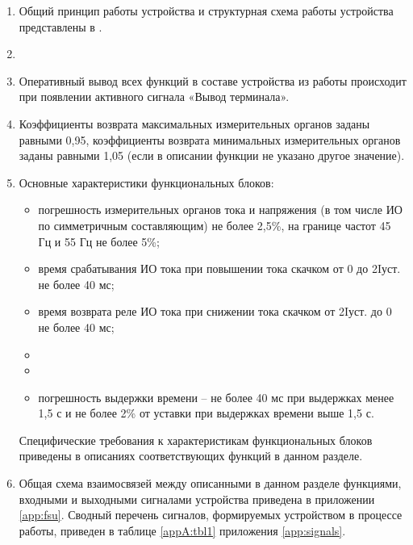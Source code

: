 \begin{enumerate}
\item
Общий принцип работы устройства и структурная схема работы устройства представлены в \ManualUnitGeneral.

\item
{}

\item
Оперативный вывод всех функций в составе устройства из работы происходит при появлении активного сигнала «Вывод терминала».

\item
Коэффициенты возврата максимальных измерительных органов заданы равными 0,95, коэффициенты возврата минимальных измерительных органов заданы равными 1,05 (если в описании функции не указано другое значение).

\item
Основные характеристики функциональных блоков:
\begin{itemize}
    \item погрешность измерительных органов тока и напряжения (в том числе ИО по симметричным составляющим) не более 2,5\%, на границе частот 45 Гц и 55 Гц не более 5\%;
    \item время срабатывания ИО тока при повышении тока скачком от 0 до 2Iуст. не более 40 мс;
    \item время возврата реле ИО тока при снижении тока скачком от 2Iуст. до 0 не более 40 мс;
    \item {}
    \item {}
    \item погрешность выдержки времени -- не более 40 мс при выдержках менее 1,5 с и не более 2\% от уставки при выдержках времени выше 1,5 с.
\end{itemize}
Специфические требования к характеристикам функциональных блоков приведены в описаниях соответствующих функций в данном разделе.

\item
Общая схема взаимосвязей между описанными в данном разделе функциями, входными и выходными сигналами устройства приведена в приложении \ref{app:fsu}.
Сводный перечень сигналов, формируемых устройством в процессе работы, приведен в таблице \ref{appA:tbl1} приложения \ref{app:signals}.

\end{enumerate}